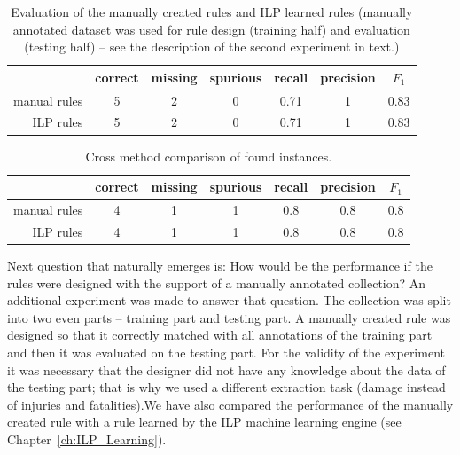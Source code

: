 \begin{table}
	\centering
	\begin{tabular}{|r|c|c|c|c|c|c|}
		\hline
		 & correct & missing & spurious & recall & precision & $F_1$\\
		\hline
		manual rules & 5 & 2 & 0 & 0.71 & 1 & 0.83\\
		\hline
		ILP rules & 5 & 2 & 0 & 0.71 & 1 & 0.83\\
		\hline
	\end{tabular}
	\caption{Evaluation of the manually created rules and ILP learned rules (manually annotated dataset was used for rule design (training half) and evaluation (testing half) -- see the description of the second experiment in text.)}
	\label{tab:ch50_damage_manual_eval}
\end{table}

\begin{table}
	\centering
	\begin{tabular}{|r|c|c|c|c|c|c|}
		\hline
		 & correct & missing & spurious & recall & precision & $F_1$\\
		\hline
		manual rules & 4 & 1 & 1 & 0.8 & 0.8 & 0.8\\
		\hline
		ILP rules & 4 & 1 & 1 & 0.8 & 0.8 & 0.8\\
		\hline
	\end{tabular}
	\caption{Cross method comparison of found instances.}
	\label{tab:ch50_damage_cross_method}
\end{table}




Next question that naturally emerges is: How would be the performance if the rules were designed with the support of a manually annotated collection? An additional experiment was made to answer that question. The collection was split into two even parts -- training part and testing part. A manually created rule was designed so that it correctly matched with all annotations of the training part and then it was evaluated on the testing part. For the validity of the experiment it was necessary that the designer did not have any knowledge about the data of the testing part; that is why we used a different extraction task (damage instead of injuries and fatalities).We have also compared the performance of the manually created rule with a rule learned by the ILP machine learning engine (see Chapter~\ref{ch:ILP_Learning}).

